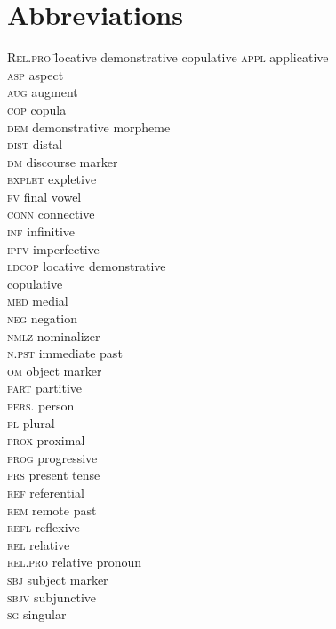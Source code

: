 \documentclass[output=paper 		  ]{langscibook}
\begin{document}
\section*{Abbreviations}
\begin{multicols}{2}
\begin{tabbing}
\textsc{Rel.pro} \=   locative demonstrative copulative\kill
\textsc{appl} \>   applicative\\
\textsc{asp} \>    aspect\\
\textsc{aug} \> augment\\
\textsc{cop}    \> copula\\
\textsc{dem}    \> demonstrative morpheme\\
\textsc{dist} \>   distal\\
\textsc{dm} \>   discourse marker\\
\textsc{explet} \>   expletive\\
\textsc{fv} \>    final vowel\\
\textsc{conn} \>   connective  \\
\textsc{inf}    \> infinitive \\
\textsc{ipfv} \>   imperfective\\
\textsc{ldcop} \>    locative demonstrative \\ \> copulative\\
\textsc{med}    \> medial\\
\textsc{neg}    \> negation\\
\textsc{nmlz} \>   nominalizer\\
\textsc{n.pst} \>   immediate past\\
\textsc{om} \>    object marker\\
\textsc{part} \>   partitive\\
\textsc{pers.} \>   person\\
\textsc{pl} \>   plural\\
\textsc{prox} \>   proximal\\
\textsc{prog} \>   progressive\\
\textsc{prs}    \> present tense\\
\textsc{ref}    \> referential\\
\textsc{rem}    \> remote past\\
\textsc{refl}   \> reflexive\\
\textsc{rel}    \> relative\\
\textsc{rel.pro} \> relative pronoun\\
\textsc{sbj}    \> subject marker\\
\textsc{sbjv} \>   subjunctive\\
\textsc{sg} \>   singular\\
\end{tabbing}
\end{multicols}

\printbibliography[heading=subbibliography,notkeyword=this]
\end{document}
